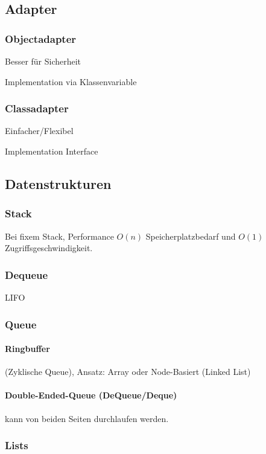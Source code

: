 \subsection{Adapter}
\subsubsection{Objectadapter}

Besser für Sicherheit

Implementation via Klassenvariable

\subsubsection{Classadapter}

Einfacher/Flexibel

Implementation Interface

\subsection{Datenstrukturen}

\subsubsection{Stack}

Bei fixem Stack, Performance $O(n)$ Speicherplatzbedarf und $O(1)$ Zugriffsgeschwindigkeit.

\subsubsection{Dequeue}

LIFO

\subsubsection{Queue}

\paragraph{Ringbuffer} (Zyklische Queue), Ansatz: Array oder Node-Basiert (Linked List)

\paragraph{Double-Ended-Queue (DeQueue/Deque)} kann von beiden Seiten durchlaufen werden.

\subsubsection{Lists}

